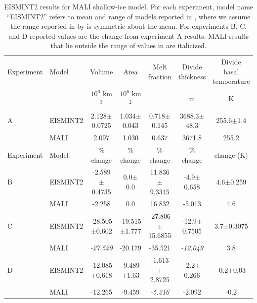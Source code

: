 \begin{table}[t]
\caption{EISMINT2 results for MALI shallow-ice model.
For each experiment, model name ``EISMINT2'' refers to mean and range of models reported in \citet{payne2000}, 
where we assume the range reported in by \citet{payne2000} is symmetric about the mean.
For experiments B, C, and D reported values are the change from experiment A results.
MALI results that lie outside the range of values in \citet{payne2000} are italicized.
}
\begin{tabular}{llccccc}
\hline
Experiment & Model  &  Volume & Area & Melt fraction & Divide thickness & Divide basal temperature \\
           &        &  $10^6$ km$^3$ & $10^6$ km$^2$ & & m & K \\
\hline
A          & EISMINT2 & 2.128$\pm$0.0725 & 1.034$\pm$0.043 & 0.718$\pm$0.145 & 3688.3$\pm$48.3 & 255.6$\pm$1.4  \\
           & MALI   & 2.097          & 1.030         & 0.637         & 3671.8        & 255.2  \\  %
\hline
Experiment & Model  &  \% change & \% change & \% change & \% change & change (K)\\
\hline
B          & EISMINT2 & -2.589$\pm$0.4735 & 0.0$\pm$0.0 & 11.836$\pm$9.3345 & -4.9$\pm$0.658 & 4.6$\pm$0.259  \\
           & MALI   & -2.258   & 0.0 & 16.832 & -5.013 & 4.6  \\  %
C          & EISMINT2 & -28.505$\pm$0.602 & -19.515$\pm$1.777 & -27.806$\pm$15.6855 & -12.9$\pm$0.7505 & 3.7$\pm$0.3075\\
           & MALI   & \it{-27.529} & -20.179 & -35.521 & \it{-12.049} & 3.8  \\    %
D          & EISMINT2 & -12.085$\pm$0.618 & -9.489$\pm$1.63 & -1.613$\pm$2.8725 & -2.2$\pm$0.266 & -0.2$\pm$0.03 \\
           & MALI   & -12.265 & -9.459 & \it{-5.216} & -2.092 & -0.2  \\        %
\hline
\end{tabular}
 \label{table-EISMINT2}
\end{table}


